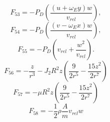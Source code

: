 \documentclass[]{article}
\begin{document}
$$
F_{53} = -P_D \left(\frac{(u+\omega_E y) w}{v_{rel}} \right),
$$
$$
F_{54} = -P_D \left(  \frac{(v-\omega_E x) w}{v_{rel}} \right),
$$
$$
F_{55} = -P_D \left( v_{rel} + \frac{w^2}{v_{rel}} \right).
$$
$$
F_{56} = -\frac{z}{r^3} - J_2 R^2  z \left( \frac{9}{2r^5} - \frac{15z^2}{2r^7} \right) 
$$
$$
F_{57} = - \mu R^2  z \left( \frac{9}{2r^5} - \frac{15z^2}{2r^7} \right) 
$$
$$
F_{58} = - \frac{1}{2} \rho \frac{A}{m} v_{rel} w
$$
\end{document}
